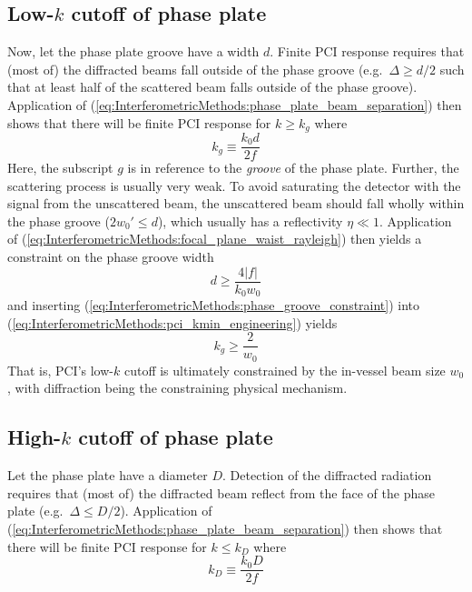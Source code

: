 \subsection{Low-$k$ cutoff of phase plate}
Now, let the phase plate groove have a width $d$.
Finite PCI response requires that (most of) the diffracted beams
fall outside of the phase groove (e.g.\ $\Delta \geq d / 2$
such that at least half of the scattered beam
falls outside of the phase groove).
Application of (\ref{eq:InterferometricMethods:phase_plate_beam_separation})
then shows that there will be finite PCI response
for $k \geq k_g$ where
\begin{equation}
  k_g \equiv \frac{k_0 d}{2 f}
  \label{eq:InterferometricMethods:pci_kmin_engineering}
\end{equation}
Here, the subscript $g$ is in reference
to the \emph{groove} of the phase plate.
Further, the scattering process is usually very weak.
To avoid saturating the detector with the signal from the unscattered beam,
the unscattered beam should fall wholly within the phase groove
($2 w_0' \leq d$), which usually has a reflectivity $\eta \ll 1$.
Application of (\ref{eq:InterferometricMethods:focal_plane_waist_rayleigh})
then yields a constraint on the phase groove width
\begin{equation}
  d \geq \frac{4 |f|}{k_0 w_0}
  \label{eq:InterferometricMethods:phase_groove_constraint}
\end{equation}
and inserting (\ref{eq:InterferometricMethods:phase_groove_constraint}) into
(\ref{eq:InterferometricMethods:pci_kmin_engineering}) yields
\begin{equation}
  k_g \geq \frac{2}{w_0}
  \label{eq:pci_kmin_physics}
\end{equation}
\graffito{\textcolor{red}{%
  Note that this is the same limit as for true far-field spatial separation
  (i.e.\ when not using focal-plane spatial separation)}
}%
That is, PCI's low-$k$ cutoff
is ultimately constrained by the in-vessel beam size $w_0$,
with diffraction being the constraining physical mechanism.


\subsection{High-$k$ cutoff of phase plate}
Let the phase plate have a diameter $D$.
Detection of the diffracted radiation
requires that (most of) the diffracted beam reflect
from the face of the phase plate
(e.g.\ $\Delta \leq D / 2$).
Application of (\ref{eq:InterferometricMethods:phase_plate_beam_separation})
then shows that there will be finite PCI response for $k \leq k_D$ where
\begin{equation}
  k_D \equiv \frac{k_0 D}{2 f}
  \label{eq:InterferometricMethods:pci_kmax_engineering}
\end{equation}


